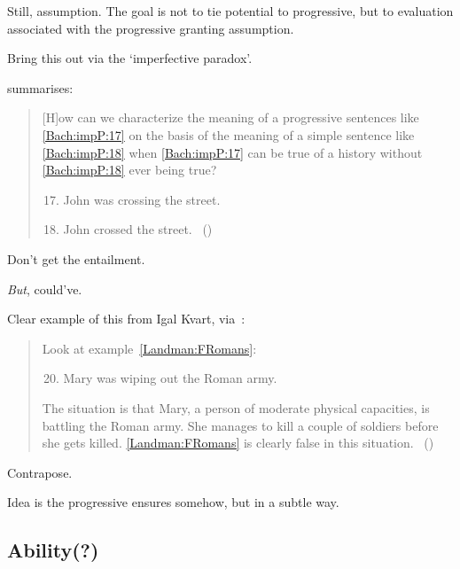 \begin{note}
{    Still, assumption.
    The goal is not to tie potential to progressive, but to evaluation associated with the progressive granting assumption.
  }

  Bring this out via the `imperfective paradox'.

  \citeauthor{Bach:1986tb} summarises:
  \begin{quote}
    [H]ow can we characterize the meaning of a progressive sentences like \ref{Bach:impP:17} on the basis of the meaning of a simple sentence like \ref{Bach:impP:18} when \ref{Bach:impP:17} can be true of a history without \ref{Bach:impP:18} ever being true?
    \begin{enumerate}[label=(\arabic*), ref=(\arabic*)]
      \setcounter{enumi}{16}
    \item
      \label{Bach:impP:17}
      John was crossing the street.
    \item
      \label{Bach:impP:18}
      John crossed the street.%
\mbox{ }\hfill\mbox{(\citeyear[12]{Bach:1986tb})}
    \end{enumerate}
  \end{quote}

  Don't get the entailment.

  \emph{But}, could've.

  Clear example of this from Igal Kvart, via~\textcite{Landman:1992wh}:

  \begin{quote}
    Look at example~\ref{Landman:FRomans}:
    \begin{enumerate}[label=(\arabic*), ref=(\arabic*)]
      \setcounter{enumi}{19}
    \item
      \label{Landman:FRomans}
      Mary was wiping out the Roman army.
    \end{enumerate}

    The situation is that Mary, a person of moderate physical capacities, is battling the Roman army.
    She manages to kill a couple of soldiers before she gets killed.
    \ref{Landman:FRomans} is clearly false in this situation.\newline
    \mbox{ }\hfill\mbox{(\citeyear[18]{Landman:1992wh})}
  \end{quote}
  Contrapose.
\end{note}

\begin{note}
  Idea is the progressive ensures somehow, but in a subtle way.
\end{note}

\subsection{Ability(?)}

